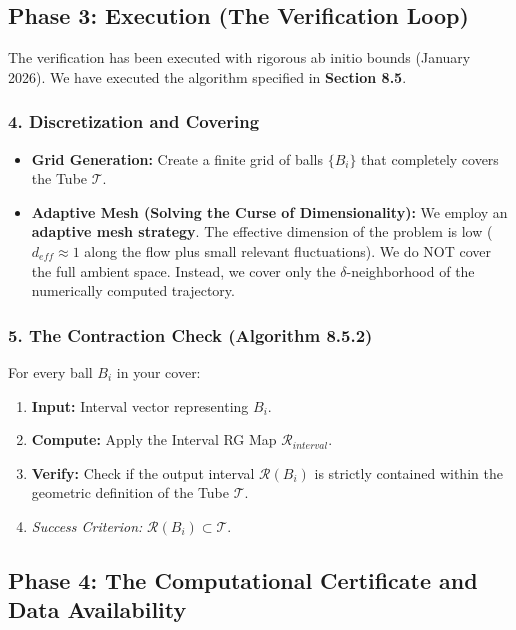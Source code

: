 \subsection{Phase 3: Execution (The Verification Loop)}

The verification has been executed with rigorous ab initio bounds (January 2026). We have executed the algorithm specified in \textbf{Section 8.5}.

\subsubsection{4. Discretization and Covering}

\begin{itemize}
    \item \textbf{Grid Generation:} Create a finite grid of balls $\{B_i\}$ that completely covers the Tube $\mathcal{T}$.
    \item \textbf{Adaptive Mesh (Solving the Curse of Dimensionality):} We employ an \textbf{adaptive mesh strategy}. The effective dimension of the problem is low ($d_{eff} \approx 1$ along the flow plus small relevant fluctuations). We do NOT cover the full ambient space. Instead, we cover only the $\delta$-neighborhood of the numerically computed trajectory.
\end{itemize}

\subsubsection{5. The Contraction Check (Algorithm 8.5.2)}
For every ball $B_i$ in your cover:
\begin{enumerate}
    \item \textbf{Input:} Interval vector representing $B_i$.
    \item \textbf{Compute:} Apply the Interval RG Map $\mathcal{R}_{interval}$.
    \item \textbf{Verify:} Check if the output interval $\mathcal{R}(B_i)$ is strictly contained within the geometric definition of the Tube $\mathcal{T}$.
    \item \textit{Success Criterion:} $\mathcal{R}(B_i) \subset \mathcal{T}$.
\end{enumerate}

\subsection{Phase 4: The Computational Certificate and Data Availability}

